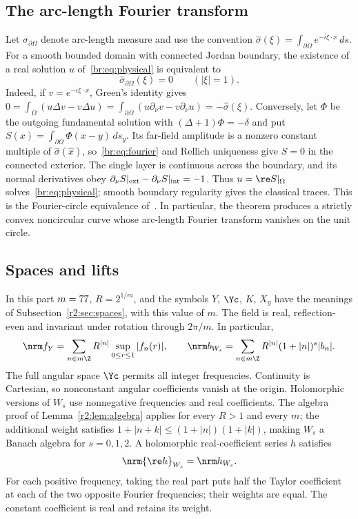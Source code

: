 \subsection{The arc-length Fourier transform}\label{br:sec:fourier}
Let $\sigma_{\partial\Omega}$ denote arc-length measure and use the convention
$\widehat\sigma(\xi)=\int_{\partial\Omega}e^{-i\xi\cdot x}\,ds$.
For a smooth bounded
domain with connected Jordan boundary, the existence of a real solution
$u$ of~\eqref{br:eq:physical} is equivalent to
\begin{equation}\label{br:eq:fourier}
 \widehat\sigma_{\partial\Omega}(\xi)=0\qquad(|\xi|=1).
\end{equation}
Indeed, if $v=e^{-i\xi\cdot x}$, Green's identity gives
$0=\int_\Omega(u\Delta v-v\Delta u)
=\int_{\partial\Omega}(u\partial_\nu v-v\partial_\nu u)
=-\widehat\sigma(\xi)$. Conversely, let $\Phi$ be the outgoing fundamental
solution with $(\Delta+1)\Phi=-\delta$ and put
$S(x)=\int_{\partial\Omega}\Phi(x-y)\,ds_y$.
Its far-field amplitude is a nonzero constant multiple of
$\widehat\sigma(\widehat x)$, so~\eqref{br:eq:fourier} and Rellich uniqueness
give $S=0$ in the connected exterior. The single layer is continuous across
the boundary, and its normal derivatives obey
$\partial_\nu S|_{\rm ext}-\partial_\nu S|_{\rm int}=-1$.
Thus $u=\re S|_\Omega$ solves~\eqref{br:eq:physical}; smooth boundary
regularity gives the classical traces. This is the Fourier-circle
equivalence of~\cite[Proposition~2.1]{CSS26}. In particular, the theorem produces a strictly
convex noncircular curve whose arc-length Fourier transform vanishes on
the unit circle.

\subsection{Spaces and lifts}\label{br:sec:spaces}
In this part $m=77$, $R=2^{1/m}$, and the symbols $Y$, $\Yc$, $K$, $X_g$
have the meanings of Subsection~\ref{r2:sec:spaces}, with this value of $m$.
The field is real, reflection-even and invariant under rotation through
$2\pi/m$. In particular,
\begin{equation}\label{br:eq:norms}
 \nrm f_Y=\sum_{n\in m\Z}R^{|n|}\sup_{0\le r\le1}|f_n(r)|,
 \qquad
 \nrm b_{W_s}=\sum_{n\in m\Z}R^{|n|}(1+|n|)^s|b_n|.
\end{equation}
The full angular space $\Yc$ permits all integer frequencies. Continuity
is Cartesian, so nonconstant angular coefficients vanish at the origin.
Holomorphic versions of $W_s$ use nonnegative frequencies and real
coefficients. The algebra proof of Lemma~\ref{r2:lem:algebra} applies for
every $R>1$ and every $m$; the additional weight satisfies
$1+|n+k|\le(1+|n|)(1+|k|)$, making $W_s$ a Banach algebra for
$s=0,1,2$. A holomorphic real-coefficient series $h$ satisfies
\begin{equation}\label{br:eq:realpart-norm}
 \nrm{\re h}_{W_s}=\nrm h_{W_s}.
\end{equation}
For each positive frequency, taking the real part puts half the Taylor
coefficient at each of the two opposite Fourier frequencies; their weights
are equal. The constant coefficient is real and retains its weight.

